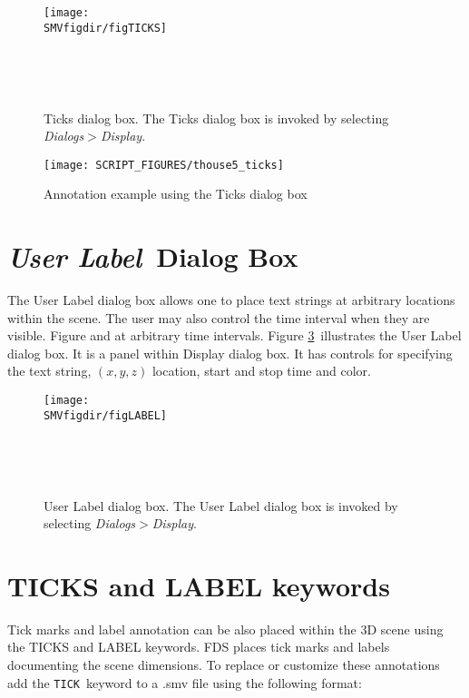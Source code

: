 \documentclass[11pt,twoside]{book}
\begin{document}
\begin{figure}[bph]
\centerline{
\texttt{[image: \\SMVfigdir/figTICKS]}
}\ \caption[Ticks dialog box.]{Ticks dialog box. The
Ticks dialog box is invoked by selecting {\em
Dialogs$>$Display}. }\ \label{figTICKSdialog}
\end{figure}

\begin{figure}[bph]
\begin{center}
\texttt{[image: SCRIPT\_FIGURES/thouse5\_ticks]}
\end{center}
\caption{Annotation example using the Ticks dialog box}
\label{figTICKSdialogexample}%
\end{figure}

\section{{\em User Label}\ Dialog Box}
The User Label dialog box allows one to place
text strings at arbitrary locations within the scene.  The user may also
control the time interval when they are visible.  Figure  and at arbitrary time intervals.
Figure \ref{figLABELdialog}\ illustrates the User Label
dialog box.  It is a panel within Display dialog box.
It has controls for specifying the text string, $(x,y,z)$ location,
start and stop time and color.

\begin{figure}[bph]
\centerline{
\texttt{[image: \\SMVfigdir/figLABEL]}
}\ \caption[User Label dialog box.]{User Label dialog
box. The User Label dialog box is invoked by selecting {\em
Dialogs$>$Display}. }\ \label{figLABELdialog}
\end{figure}


\section{TICKS and LABEL keywords}
Tick marks and label annotation
can be also placed within the 3D scene using the TICKS and LABEL keywords.
FDS places tick marks and labels
documenting the scene dimensions.  To replace or customize
these annotations add the {\tt TICK}\ keyword to a .smv file
using the following format:
\end{document}
